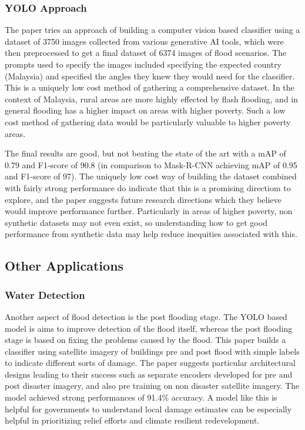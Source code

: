 \documentclass[conference,a4paper]{IEEEtran}
\begin{document}
\subsubsection{YOLO Approach}

The paper tries an approach of building a computer vision based classifier using a dataset of 3750 images collected from various generative AI tools, which were then preprocessed to get a final dataset of 6374 images of flood scenarios. The prompts used to specify the images included specifying the expected country (Malaysia) and specified the angles they knew they would need for the classifier. This is a uniquely low cost method of gathering a comprehensive dataset. In the context of Malaysia, rural areas are more highly effected by flash flooding, and in general flooding has a higher impact on areas with higher poverty. Such a low cost method of gathering data would be particularly valuable to higher poverty areas.

The final results are good, but not beating the state of the art with a mAP of 0.79 and F1-score of 90.8 (in comparison to Mask-R-CNN achieving mAP of 0.95 and F1-score of 97). The uniquely low cost way of building the dataset combined with fairly strong performance do indicate that this is a promising directiom to explore, and the paper suggests future research directions which they believe would improve performance further. Particularly in areas of higher poverty, non synthetic datasets may not even exist, so understanding how to get good performance from synthetic data may help reduce inequities associated with this.


\subsection{Other Applications}

\subsubsection{Water Detection}

Another aspect of flood detection is the post flooding stage. The YOLO based model is aims to improve detection of the flood itself, whereas the post flooding stage is based on fixing the problems caused by the flood. This paper builds a classifier using satellite imagery of buildings pre and post flood with simple labels to indicate different sorts of damage.  The paper suggests particular architectural designs leading to their success such as separate encoders developed for pre and post disaster imagery, and also pre training on non disaster satellite imagery. The model achieved strong performances of 91.4\% accuracy.  A model like this is helpful for governments to understand local damage estimates can be especially helpful in prioritizing relief efforts and climate resilient redevelopment.
\end{document}
